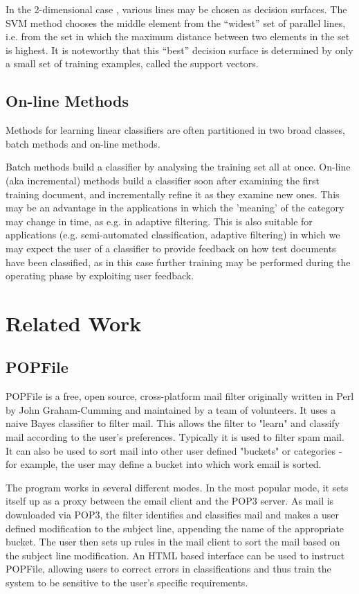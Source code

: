 In the 2-dimensional case , various lines may be chosen as decision surfaces. The SVM method chooses the middle element from the “widest” set of parallel lines, i.e. from the set in which the maximum distance between two elements in the set is highest. It is noteworthy that this “best” decision surface is determined by only a small set of training examples, called the support vectors.

\subsection{On-line Methods}
Methods for learning linear classifiers are often partitioned in two broad classes, batch methods and on-line methods.

Batch methods build a classifier by analysing the training set all at once. On-line (aka incremental) methods build a classifier soon after examining the first training document, and incrementally refine it as they examine new ones. This may be an advantage in the applications in which the 'meaning' of the category may change in time, as e.g. in adaptive filtering. This is also suitable for applications (e.g. semi-automated classification, adaptive filtering) in which we may expect the user of a classifier to provide feedback on how test documents have been classified, as in this case further training may be performed during the operating phase by exploiting user feedback.

\section{Related Work}

\subsection{POPFile}
POPFile is a free, open source, cross-platform mail filter originally written in Perl by John Graham-Cumming and maintained by a team of volunteers. It uses a naive Bayes classifier to filter mail. This allows the filter to "learn" and classify mail according to the user's preferences. Typically it is used to filter spam mail. It can also be used to sort mail into other user defined "buckets" or categories - for example, the user may define a bucket into which work email is sorted.

The program works in several different modes. In the most popular mode, it sets itself up as a proxy between the email client and the POP3 server. As mail is downloaded via POP3, the filter identifies and classifies mail and makes a user defined modification to the subject line, appending the name of the appropriate bucket. The user then sets up rules in the mail client to sort the mail based on the subject line modification. An HTML based interface can be used to instruct POPFile, allowing users to correct errors in classifications and thus train the system to be sensitive to the user's specific requirements.

